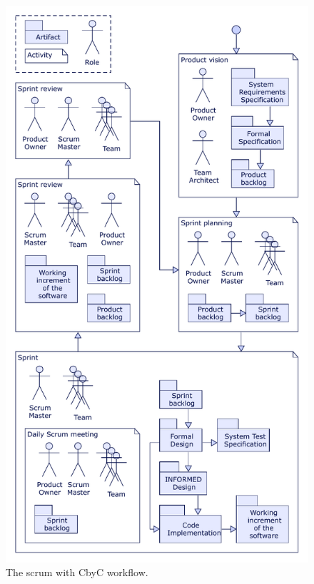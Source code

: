 \begin{figure}[H]
	\centering
	\includegraphics[scale=0.75]{Figures/Scrum_CbyC_workflow.pdf}
	\decoRule
	\caption{The scrum with CbyC workflow.}
	\label{fig:ScrumCbyCWorkflow}
\end{figure}






